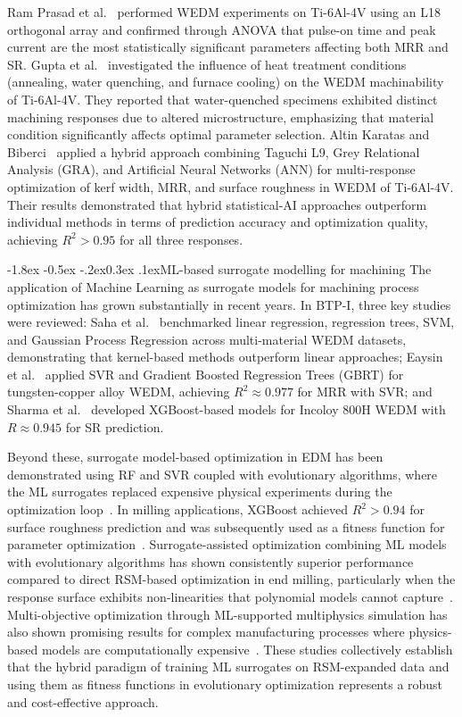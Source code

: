 \documentclass[12pt, a4paper]{report}
\makeatletter
\renewcommand{\section}{\@startsection{section}{1}{\z@}%
  {-1.8ex \@plus -0.5ex \@minus -.2ex}{0.3ex \@plus.1ex}{\normalfont\bfseries}}
\makeatother
\begin{document}
Ram Prasad et al.~\cite{Prasad2014} performed WEDM experiments on Ti-6Al-4V using an L18 orthogonal array and confirmed through ANOVA that pulse-on time and peak current are the most statistically significant parameters affecting both MRR and SR. Gupta et al.~\cite{Gupta2021} investigated the influence of heat treatment conditions (annealing, water quenching, and furnace cooling) on the WEDM machinability of Ti-6Al-4V. They reported that water-quenched specimens exhibited distinct machining responses due to altered microstructure, emphasizing that material condition significantly affects optimal parameter selection. Altin Karatas and Biberci~\cite{AltinKaratas2023} applied a hybrid approach combining Taguchi L9, Grey Relational Analysis (GRA), and Artificial Neural Networks (ANN) for multi-response optimization of kerf width, MRR, and surface roughness in WEDM of Ti-6Al-4V. Their results demonstrated that hybrid statistical-AI approaches outperform individual methods in terms of prediction accuracy and optimization quality, achieving $R^2 > 0.95$ for all three responses.

\section{ML-based surrogate modelling for machining}
The application of Machine Learning as surrogate models for machining process optimization has grown substantially in recent years. In BTP-I, three key studies were reviewed: Saha et al.~\cite{Saha2021} benchmarked linear regression, regression trees, SVM, and Gaussian Process Regression across multi-material WEDM datasets, demonstrating that kernel-based methods outperform linear approaches; Eaysin et al.~\cite{Eaysin2025} applied SVR and Gradient Boosted Regression Trees (GBRT) for tungsten-copper alloy WEDM, achieving $R^2 \approx 0.977$ for MRR with SVR; and Sharma et al.~\cite{Sharma2025} developed XGBoost-based models for Incoloy 800H WEDM with $R \approx 0.945$ for SR prediction.

Beyond these, surrogate model-based optimization in EDM has been demonstrated using RF and SVR coupled with evolutionary algorithms, where the ML surrogates replaced expensive physical experiments during the optimization loop~\cite{SurrogateEDM2024}. In milling applications, XGBoost achieved $R^2 > 0.94$ for surface roughness prediction and was subsequently used as a fitness function for parameter optimization~\cite{MLMilling2022}. Surrogate-assisted optimization combining ML models with evolutionary algorithms has shown consistently superior performance compared to direct RSM-based optimization in end milling, particularly when the response surface exhibits non-linearities that polynomial models cannot capture~\cite{SurrogateEndMill2020}. Multi-objective optimization through ML-supported multiphysics simulation has also shown promising results for complex manufacturing processes where physics-based models are computationally expensive~\cite{MLMultiphysics2023}. These studies collectively establish that the hybrid paradigm of training ML surrogates on RSM-expanded data and using them as fitness functions in evolutionary optimization represents a robust and cost-effective approach.
\end{document}
